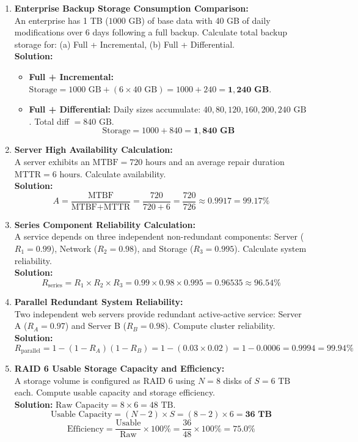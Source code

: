 \begin{enumerate}[label=\textbf{Problem \arabic*.},leftmargin=1.5cm]
\item \textbf{Enterprise Backup Storage Consumption Comparison:} \\
An enterprise has 1 TB ($1000\text{ GB}$) of base data with 40 GB of daily modifications over 6 days following a full backup. Calculate total backup storage for: (a) Full + Incremental, (b) Full + Differential. \\
\textbf{Solution:}
\begin{itemize}
    \item \textbf{Full + Incremental:} $\text{Storage} = 1000\text{ GB} + (6 \times 40\text{ GB}) = 1000 + 240 = \mathbf{1,240\text{ GB}}$.
    \item \textbf{Full + Differential:} Daily sizes accumulate: $40, 80, 120, 160, 200, 240\text{ GB}$. Total diff $= 840\text{ GB}$.
    \[
    \text{Storage} = 1000 + 840 = \mathbf{1,840\text{ GB}}
    \]
\end{itemize}

\item \textbf{Server High Availability Calculation:} \\
A server exhibits an $\text{MTBF} = 720\text{ hours}$ and an average repair duration $\text{MTTR} = 6\text{ hours}$. Calculate availability. \\
\textbf{Solution:}
\[
A = \frac{\text{MTBF}}{\text{MTBF} + \text{MTTR}} = \frac{720}{720 + 6} = \frac{720}{726} \approx \mathbf{0.9917 = 99.17\%}
\]

\item \textbf{Series Component Reliability Calculation:} \\
A service depends on three independent non-redundant components: Server ($R_1 = 0.99$), Network ($R_2 = 0.98$), and Storage ($R_3 = 0.995$). Calculate system reliability. \\
\textbf{Solution:}
\[
R_{\text{series}} = R_1 \times R_2 \times R_3 = 0.99 \times 0.98 \times 0.995 = \mathbf{0.96535 \approx 96.54\%}
\]

\item \textbf{Parallel Redundant System Reliability:} \\
Two independent web servers provide redundant active-active service: Server A ($R_A = 0.97$) and Server B ($R_B = 0.98$). Compute cluster reliability. \\
\textbf{Solution:}
\[
R_{\text{parallel}} = 1 - (1 - R_A)(1 - R_B) = 1 - (0.03 \times 0.02) = 1 - 0.0006 = \mathbf{0.9994 = 99.94\%}
\]

\item \textbf{RAID 6 Usable Storage Capacity and Efficiency:} \\
A storage volume is configured as RAID 6 using $N = 8$ disks of $S = 6\text{ TB}$ each. Compute usable capacity and storage efficiency. \\
\textbf{Solution:} $\text{Raw Capacity} = 8 \times 6 = 48\text{ TB}$.
\[
\text{Usable Capacity} = (N - 2) \times S = (8 - 2) \times 6 = \mathbf{36\text{ TB}}
\]
\[
\text{Efficiency} = \frac{\text{Usable}}{\text{Raw}} \times 100\% = \frac{36}{48} \times 100\% = \mathbf{75.0\%}
\]


\end{enumerate}
